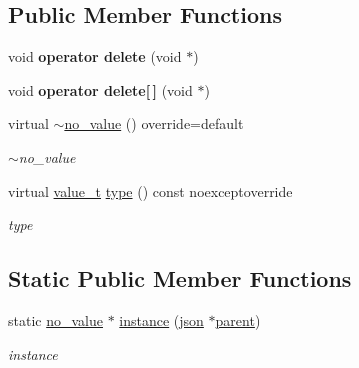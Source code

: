 \subsection*{Public Member Functions}
\begin{DoxyCompactItemize}
\item 
void {\bfseries operator delete} (void $\ast$)\hypertarget{classformat_1_1no__value_a0e3cf7fff86241a7ca840a5ab6aa0097}{}\label{classformat_1_1no__value_a0e3cf7fff86241a7ca840a5ab6aa0097}

\item 
void {\bfseries operator delete\mbox{[}$\,$\mbox{]}} (void $\ast$)\hypertarget{classformat_1_1no__value_a8a81fb06723992b2daa275deffd23517}{}\label{classformat_1_1no__value_a8a81fb06723992b2daa275deffd23517}

\item 
virtual \hyperlink{classformat_1_1no__value_a86937bee6e9e4d514d33070be05ad7c6}{$\sim$no\+\_\+value} () override=default\hypertarget{classformat_1_1no__value_a86937bee6e9e4d514d33070be05ad7c6}{}\label{classformat_1_1no__value_a86937bee6e9e4d514d33070be05ad7c6}

\begin{DoxyCompactList}\small\item\em $\sim$no\+\_\+value \end{DoxyCompactList}\item 
virtual \hyperlink{classformat_1_1value_aa0334be06389a7b14af485fa0cd3aa21}{value\+\_\+t} \hyperlink{classformat_1_1no__value_a2819b3ce13265c40a74d4f11c2577bf5}{type} () const noexceptoverride
\begin{DoxyCompactList}\small\item\em type \end{DoxyCompactList}\end{DoxyCompactItemize}
\subsection*{Static Public Member Functions}
\begin{DoxyCompactItemize}
\item 
static \hyperlink{classformat_1_1no__value}{no\+\_\+value} $\ast$ \hyperlink{classformat_1_1no__value_aba9972bb8f7336f2f62270ceee861abf}{instance} (\hyperlink{classformat_1_1json}{json} $\ast$\hyperlink{classformat_1_1value_a86c03ec8810bfd0d60ec49095120040d}{parent})
\begin{DoxyCompactList}\small\item\em instance \end{DoxyCompactList}\end{DoxyCompactItemize}
